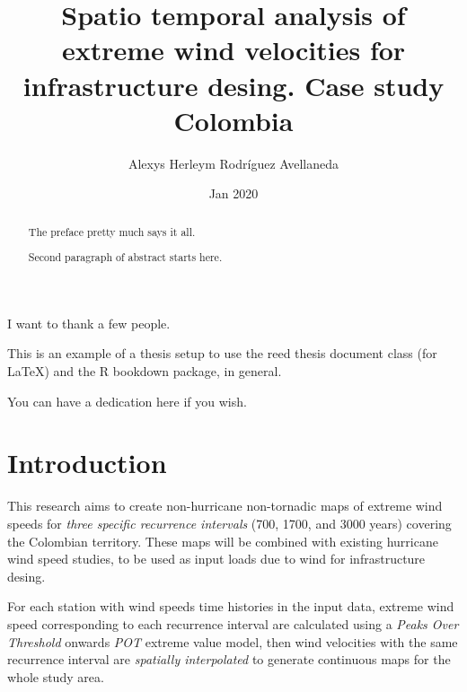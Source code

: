 \documentclass[12pt,twoside]{reedthesis}
\title{Spatio temporal analysis of extreme wind velocities for infrastructure desing. Case study Colombia}
\author{Alexys Herleym Rodríguez Avellaneda}
\date{Jan 2020}
\begin{document}
  \maketitle

\frontmatter %
\pagestyle{empty} %
  \begin{acknowledgements}
    I want to thank a few people.
  \end{acknowledgements}
  \begin{preface}
    This is an example of a thesis setup to use the reed thesis document class
    (for LaTeX) and the R bookdown package, in general.
  \end{preface}
  \hypersetup{linkcolor=black}
  \setcounter{tocdepth}{2}
  \tableofcontents

  \listoftables

  \listoffigures
  \begin{abstract}
    The preface pretty much says it all.
    
    \par
    
    Second paragraph of abstract starts here.
  \end{abstract}
  \begin{dedication}
    You can have a dedication here if you wish.
  \end{dedication}
\mainmatter %
\pagestyle{fancyplain} %

\hypertarget{introduction}{%
\chapter*{Introduction}\label{introduction}}

This research aims to create non-hurricane non-tornadic maps of extreme wind speeds for \emph{three specific recurrence intervals} (700, 1700, and 3000 years) covering the Colombian territory. These maps will be combined with existing hurricane wind speed studies, to be used as input loads due to wind for infrastructure desing.

For each station with wind speeds time histories in the input data, extreme wind speed corresponding to each recurrence interval are calculated using a \emph{Peaks Over Threshold} onwards \emph{POT} extreme value model, then wind velocities with the same recurrence interval are \emph{spatially interpolated} to generate continuous maps for the whole study area.
\end{document}
